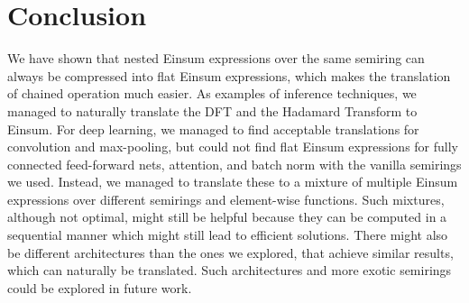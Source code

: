 \chapter{Conclusion}


We have shown that nested Einsum expressions over the same semiring can always be compressed into flat Einsum expressions, which makes the translation of chained operation much easier.
As examples of inference techniques, we managed to naturally translate the DFT and the Hadamard Transform to Einsum.
For deep learning, we managed to find acceptable translations for convolution and max-pooling,
but could not find flat Einsum expressions for fully connected feed-forward nets, attention, and batch norm with the vanilla semirings we used.
Instead, we managed to translate these to a mixture of multiple Einsum expressions over different semirings and element-wise functions.
Such mixtures, although not optimal, might still be helpful because they can be computed in a sequential manner which might still lead to efficient solutions.
There might also be different architectures than the ones we explored, that achieve similar results, which can naturally be translated.
Such architectures and more exotic semirings could be explored in future work.
